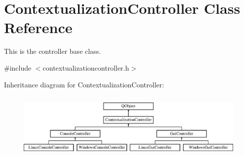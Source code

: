 \hypertarget{classContextualizationController}{}\section{Contextualization\+Controller Class Reference}
\label{classContextualizationController}


This is the controller base class.  




{\ttfamily \#include $<$contextualizationcontroller.\+h$>$}

Inheritance diagram for Contextualization\+Controller\+:\begin{figure}[H]
\begin{center}
\leavevmode
\includegraphics[height=3.255814cm]{classContextualizationController}
\end{center}
\end{figure}
